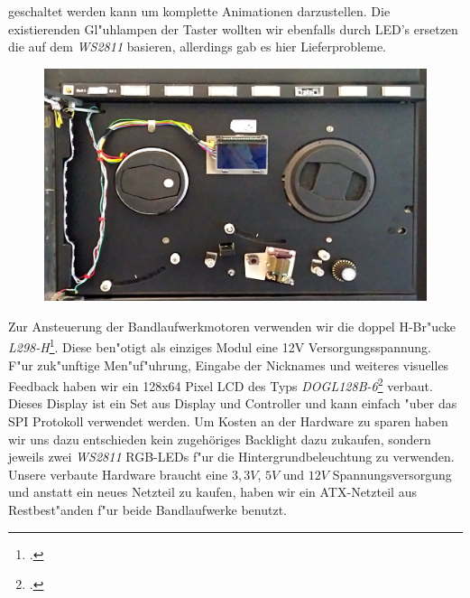 \documentclass[a4paper]{article}
\begin{document}
    geschaltet werden kann um komplette Animationen darzustellen. Die existierenden Gl"uhlampen der
    Taster wollten wir ebenfalls durch LED's ersetzen die auf dem \textit{WS2811} basieren,
    allerdings gab es hier Lieferprobleme.\\
    \begin{figure}
      \centering
      \label{figure:Bandlaufwerke}
      \includegraphics[scale=0.075]{Frontansicht.jpg}
    \end{figure}
    Zur Ansteuerung der Bandlaufwerkmotoren verwenden wir die doppel H-Br"ucke
    \textit{L298-H}\footcite{L298H}. Diese ben"otigt als einziges Modul eine 12V
    Versorgungsspannung.\\ F"ur zuk"unftige Men"uf"uhrung, Eingabe der
    Nicknames und weiteres visuelles Feedback haben wir ein 128x64 Pixel LCD
    des Typs \textit{DOGL128B-6}\footcite{DOGL128B} verbaut. Dieses Display ist ein Set aus
    Display und Controller und kann einfach "uber das SPI Protokoll verwendet
    werden. Um Kosten an der Hardware zu sparen haben wir uns dazu entschieden
    kein zugehöriges Backlight dazu zukaufen, sondern jeweils zwei
    \textit{WS2811} RGB-LEDs f"ur die Hintergrundbeleuchtung zu verwenden.\\
    Unsere verbaute Hardware braucht eine \( 3,3 V \), \( 5 V \) und \( 12 V \) Spannungsversorgung
    und anstatt ein neues Netzteil zu kaufen, haben wir ein ATX-Netzteil aus Restbest"anden f"ur beide
    Bandlaufwerke benutzt.
\end{document}
